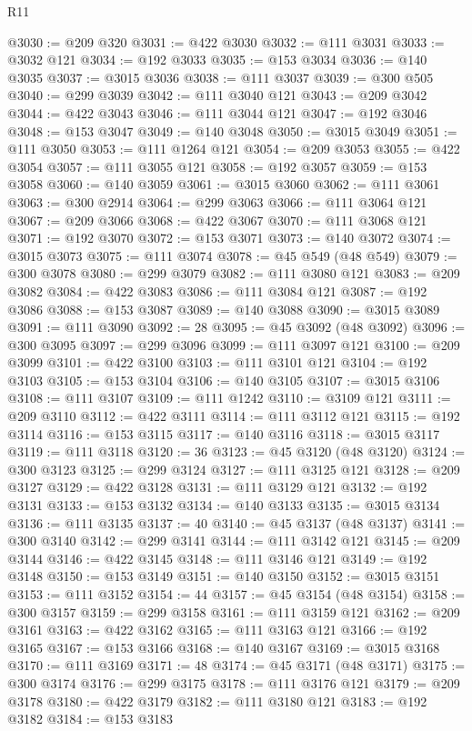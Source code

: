 \begin{lexlean}{R11}
\begin{coremodule}
@3030 := @209 @320
@3031 := @422 @3030
@3032 := @111 @3031
@3033 := @3032 @121
@3034 := @192 @3033
@3035 := @153 @3034
@3036 := @140 @3035
@3037 := @3015 @3036
@3038 := @111 @3037
@3039 := @300 @505
@3040 := @299 @3039
@3042 := @111 @3040 @121
@3043 := @209 @3042
@3044 := @422 @3043
@3046 := @111 @3044 @121
@3047 := @192 @3046
@3048 := @153 @3047
@3049 := @140 @3048
@3050 := @3015 @3049
@3051 := @111 @3050
@3053 := @111 @1264 @121
@3054 := @209 @3053
@3055 := @422 @3054
@3057 := @111 @3055 @121
@3058 := @192 @3057
@3059 := @153 @3058
@3060 := @140 @3059
@3061 := @3015 @3060
@3062 := @111 @3061
@3063 := @300 @2914
@3064 := @299 @3063
@3066 := @111 @3064 @121
@3067 := @209 @3066
@3068 := @422 @3067
@3070 := @111 @3068 @121
@3071 := @192 @3070
@3072 := @153 @3071
@3073 := @140 @3072
@3074 := @3015 @3073
@3075 := @111 @3074
@3078 := @45 @549 (@48 @549)
@3079 := @300 @3078
@3080 := @299 @3079
@3082 := @111 @3080 @121
@3083 := @209 @3082
@3084 := @422 @3083
@3086 := @111 @3084 @121
@3087 := @192 @3086
@3088 := @153 @3087
@3089 := @140 @3088
@3090 := @3015 @3089
@3091 := @111 @3090
@3092 := 28
@3095 := @45 @3092 (@48 @3092)
@3096 := @300 @3095
@3097 := @299 @3096
@3099 := @111 @3097 @121
@3100 := @209 @3099
@3101 := @422 @3100
@3103 := @111 @3101 @121
@3104 := @192 @3103
@3105 := @153 @3104
@3106 := @140 @3105
@3107 := @3015 @3106
@3108 := @111 @3107
@3109 := @111 @1242
@3110 := @3109 @121
@3111 := @209 @3110
@3112 := @422 @3111
@3114 := @111 @3112 @121
@3115 := @192 @3114
@3116 := @153 @3115
@3117 := @140 @3116
@3118 := @3015 @3117
@3119 := @111 @3118
@3120 := 36
@3123 := @45 @3120 (@48 @3120)
@3124 := @300 @3123
@3125 := @299 @3124
@3127 := @111 @3125 @121
@3128 := @209 @3127
@3129 := @422 @3128
@3131 := @111 @3129 @121
@3132 := @192 @3131
@3133 := @153 @3132
@3134 := @140 @3133
@3135 := @3015 @3134
@3136 := @111 @3135
@3137 := 40
@3140 := @45 @3137 (@48 @3137)
@3141 := @300 @3140
@3142 := @299 @3141
@3144 := @111 @3142 @121
@3145 := @209 @3144
@3146 := @422 @3145
@3148 := @111 @3146 @121
@3149 := @192 @3148
@3150 := @153 @3149
@3151 := @140 @3150
@3152 := @3015 @3151
@3153 := @111 @3152
@3154 := 44
@3157 := @45 @3154 (@48 @3154)
@3158 := @300 @3157
@3159 := @299 @3158
@3161 := @111 @3159 @121
@3162 := @209 @3161
@3163 := @422 @3162
@3165 := @111 @3163 @121
@3166 := @192 @3165
@3167 := @153 @3166
@3168 := @140 @3167
@3169 := @3015 @3168
@3170 := @111 @3169
@3171 := 48
@3174 := @45 @3171 (@48 @3171)
@3175 := @300 @3174
@3176 := @299 @3175
@3178 := @111 @3176 @121
@3179 := @209 @3178
@3180 := @422 @3179
@3182 := @111 @3180 @121
@3183 := @192 @3182
@3184 := @153 @3183

\end{coremodule}
\end{lexlean}
